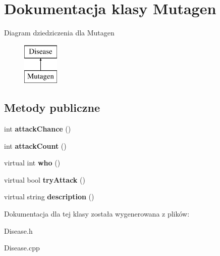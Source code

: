 \hypertarget{classMutagen}{}\section{Dokumentacja klasy Mutagen}
\label{classMutagen}
Diagram dziedziczenia dla Mutagen\begin{figure}[H]
\begin{center}
\leavevmode
\includegraphics[height=2.000000cm]{classMutagen}
\end{center}
\end{figure}
\subsection*{Metody publiczne}
\begin{DoxyCompactItemize}
\item 
int {\bfseries attack\+Chance} ()\hypertarget{classMutagen_afcd518c374fa5802575bcc5b4e7b98cd}{}\label{classMutagen_afcd518c374fa5802575bcc5b4e7b98cd}

\item 
int {\bfseries attack\+Count} ()\hypertarget{classMutagen_a2049d82c471219087055da1bc4bb6f71}{}\label{classMutagen_a2049d82c471219087055da1bc4bb6f71}

\item 
virtual int {\bfseries who} ()\hypertarget{classMutagen_a620c593682e56b1a0039f8f1aeea4f39}{}\label{classMutagen_a620c593682e56b1a0039f8f1aeea4f39}

\item 
virtual bool {\bfseries try\+Attack} ()\hypertarget{classMutagen_a6c495ef43212c37e125b771d8d02898c}{}\label{classMutagen_a6c495ef43212c37e125b771d8d02898c}

\item 
virtual string {\bfseries description} ()\hypertarget{classMutagen_a47ac6ab84065448d49954c57fb555a3e}{}\label{classMutagen_a47ac6ab84065448d49954c57fb555a3e}

\end{DoxyCompactItemize}


Dokumentacja dla tej klasy została wygenerowana z plików\+:\begin{DoxyCompactItemize}
\item 
Disease.\+h\item 
Disease.\+cpp\end{DoxyCompactItemize}
